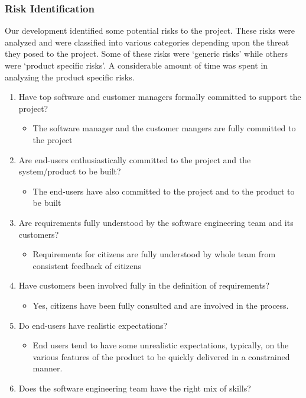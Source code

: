 \documentclass[10pt,a4paper]
{article}
\numberwithin{table}{section}
\begin{document}
{{\begin{normalsize}
\subsubsection{Risk Identification}
\hspace*{0.3cm}Our development identified some potential risks to the project. These risks were analyzed and were classified into various categories depending upon the threat they posed to the project. Some of these risks were ‘generic risks’ while others were ‘product specific risks’. A considerable amount of time was spent in analyzing the product specific risks.

\begin{enumerate}
\item Have top software and customer managers formally committed to support the project?
 	\begin{itemize} \item The software manager and the customer mangers are fully committed to the project \end{itemize}
\item Are end-users enthusiastically committed to the project and the system/product to be built?
\begin{itemize} \item The end-users have also committed to the project and to the product to be built \end{itemize}
\item Are requirements fully understood by the software engineering team and its customers?
\begin{itemize} \item  Requirements for citizens are fully understood by whole team from consistent feedback of citizens \end{itemize}
\item Have customers been involved fully in the definition of requirements?
\begin{itemize} \item  Yes, citizens have been fully consulted and are involved in the process.\end{itemize}
\item Do end-users have realistic expectations? 
\begin{itemize} \item  End users tend to have some unrealistic expectations, typically, on the various features of the product to be quickly delivered in a constrained manner. \end{itemize}
\item Does the software engineering team have the right mix of skills?

\end{enumerate}
\end{normalsize}}}
\end{document}
